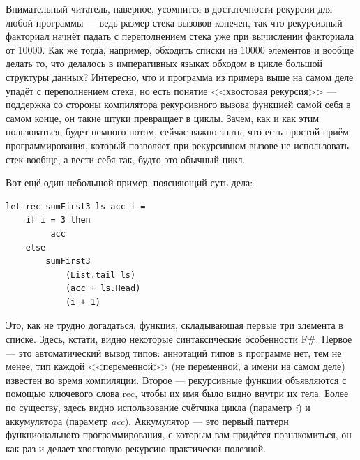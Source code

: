 \documentclass[a5paper]{article}
\begin{document}
Внимательный читатель, наверное, усомнится в достаточности рекурсии для любой программы --- ведь размер стека вызовов конечен, так что рекурсивный факториал начнёт падать с переполнением стека уже при вычислении факториала от 10000. Как же тогда, например, обходить списки из 10000 элементов и вообще делать то, что делалось в императивных языках обходом в цикле большой структуры данных? Интересно, что и программа из примера выше на самом деле упадёт с переполнением стека, но есть понятие <<хвостовая рекурсия>> --- поддержка со стороны компилятора рекурсивного вызова функцией самой себя в самом конце, он такие штуки превращает в циклы. Зачем, как и как этим пользоваться, будет немного потом, сейчас важно знать, что есть простой приём программирования, который позволяет при рекурсивном вызове не использовать стек вообще, а вести себя так, будто это обычный цикл.

Вот ещё один небольшой пример, поясняющий суть дела:
\begin{verbatim}
let rec sumFirst3 ls acc i =
    if i = 3 then 
         acc 
    else 
        sumFirst3 
            (List.tail ls) 
            (acc + ls.Head) 
            (i + 1)
\end{verbatim}

Это, как не трудно догадаться, функция, складывающая первые три элемента в списке. Здесь, кстати, видно некоторые синтаксические особенности F\#. Первое --- это автоматический вывод типов: аннотаций типов в программе нет, тем не менее, тип каждой <<переменной>> (не переменной, а имени на самом деле) известен во время компиляции. Второе --- рекурсивные функции объявляются с помощью ключевого слова rec, чтобы их имя было видно внутри их тела. Более по существу, здесь видно использование счётчика цикла (параметр \textit{i}) и аккумулятора (параметр \textit{acc}). Аккумулятор --- это первый паттерн функционального программирования, с которым вам придётся познакомиться, он как раз и делает хвостовую рекурсию практически полезной. 
\end{document}
